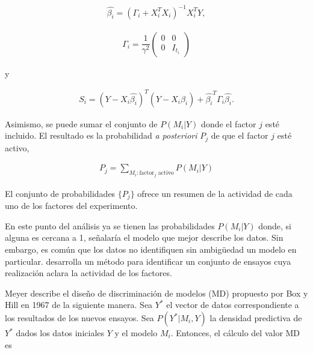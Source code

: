 \begin{equation} \label{betai}
	\begin{aligned}
		\hat{\beta_i} = (\Gamma_i + X_i^{T} X_i)^{-1} X_i^{T} Y, 
	\end{aligned}
\end{equation}

\begin{equation} \label{gamma_i}
	\begin{aligned}
		\Gamma_i = \dfrac{1}{\gamma^{2}} 
		\begin{pmatrix}
			0 & 0 \\
			0 & I_{t_i}
		\end{pmatrix} 
	\end{aligned}
\end{equation}

y 

\begin{equation} \label{delta_i}
	\begin{aligned}
		S_i = (Y - X_i \hat{\beta_i})^{T} (Y - X_i \hat{\beta_i}) + \hat{\beta_i}^{T} \Gamma_i \hat{\beta_i}.
	\end{aligned}
\end{equation}

Asimismo, se puede sumar el conjunto de $P(M_i | Y)$ donde el factor $j$ esté incluido. El resultado es la probabilidad \textit{a posteriori}  $P_j$ de que el factor $j$ esté activo, 

\begin{equation} \label{eq_pj}
	\begin{aligned}
		P_j = \sum_{M_i:\text{factor}_{j}\text{ activo}} P(M_i | Y)
	\end{aligned}
\end{equation}

\noindent El conjunto de probabilidades $\{ P_j \}$ ofrece un resumen de la actividad de cada uno de los factores del experimento. 

En este punto del análisis ya se tienen las probabilidades $P(M_i | Y)$ donde, si alguna es cercana a 1, señalaría el modelo que mejor describe los datos. Sin embargo, es común que los datos no identifiquen sin ambigüedad un modelo en particular. \cite{meyer1996} desarrolla un método para identificar un conjunto de ensayos cuya realización aclara la actividad de los factores. 

Meyer describe el diseño de discriminación de modelos (MD) propuesto por Box y Hill en 1967 de la siguiente manera. Sea $Y^{*}$ el vector de datos correspondiente a los resultados de los nuevos ensayos. Sea $P(Y^{*}| M_i, Y)$ la densidad predictiva de $Y^{*}$ dados los datos iniciales $Y$ y el modelo $M_i$. Entonces, el cálculo del valor MD es

